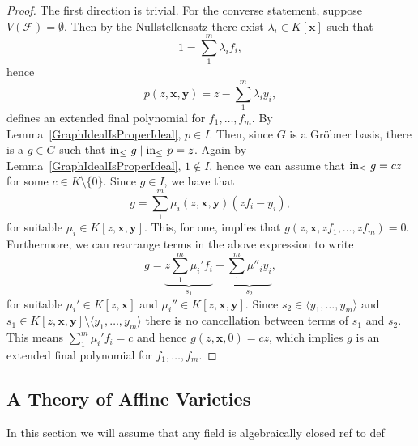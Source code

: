 \begin{proof}
    The first direction is trivial. For the converse statement, suppose $V(\mathcal{F}) = \emptyset$. Then by the Nullstellensatz there exist $\lambda_i\in K[\mathbf{x}]$ such that 
    $$1 = \sum_1^m \lambda_i f_i,$$
    hence
    $$p(z,\mathbf{x},\mathbf{y}) = z - \sum_1^m \lambda_i y_i,$$
    defines an extended final polynomial for $f_1,\dots,f_m$. By Lemma~\ref{GraphIdealIsProperIdeal}, $p\in I$. Then, since $G$ is a Gröbner basis, there is a $g\in G$ such that 
    $\mathrm{in}_\leq\ g \mid \mathrm{in}_\leq\ p = z$. Again by Lemma~\ref{GraphIdealIsProperIdeal}, $1\notin I$, hence we can assume that $\mathrm{in}_\leq \ g = cz$ for some $c\in K\setminus\{0\}$. Since $g\in I$, we have that 
    \begin{equation*}
        g = \sum_1^m \mu_i(z,\mathbf{x},\mathbf{y}) (zf_i -y_i),
    \end{equation*}
    for suitable $\mu_i \in K[z,\mathbf{x},\mathbf{y}]$. This, for one, implies that $g(z,\mathbf{x},zf_1,\dots,zf_m)=0$. Furthermore, we can rearrange terms in the above expression to write 
    $$g = \underbrace{z\sum_1^m \mu_i'f_i}_{s_1} - \underbrace{\sum_1^m \mu''_iy_i}_{s_2},$$
    for suitable $\mu_i'\in K[z,\mathbf{x}]$ and $\mu_i''\in K[z,\mathbf{x},\mathbf{y}]$.
    Since $s_2\in \langle y_1,\dots,y_m\rangle$ and\\ $s_1\in K[z,\mathbf{x},\mathbf{y}]\setminus \langle y_1,\dots,y_m\rangle$ there is no cancellation between terms of $s_1$ and $s_2$. This means $\sum_1^m\mu_i'f_i=c$ and hence $g(z,\mathbf{x},0)=cz$, which implies $g$ is an extended final polynomial for $f_1,\dots,f_m$.
\end{proof}
\subsection{A Theory of Affine Varieties}
In this section we will assume that any field is algebraically closed {\LARGE ref to def}
